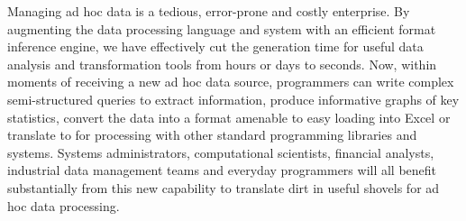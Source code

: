 Managing ad hoc data is a tedious, error-prone and costly enterprise.
By augmenting the \pads{} data processing language and system with an
efficient format inference engine, we have effectively cut the
generation time for useful data analysis and transformation tools from
hours or days to seconds.  Now, within moments of receiving a new ad
hoc data source, programmers can write complex semi-structured queries
to extract information, produce informative graphs of key statistics,
convert the data into a format amenable to easy loading into
Excel or translate to \xml{} for processing with other
standard programming libraries and systems.  Systems administrators,
computational scientists, financial analysts, industrial data
management teams and everyday programmers will all benefit
substantially from this new capability to translate dirt in useful
shovels for ad hoc data processing.
